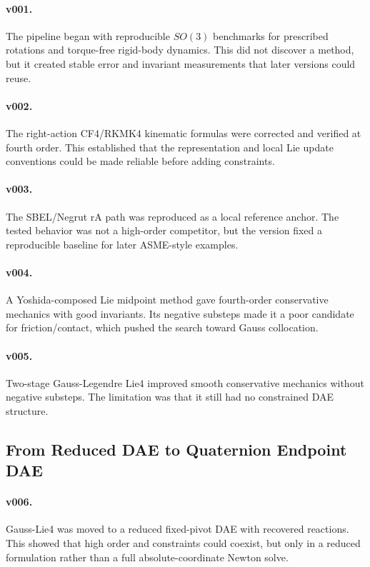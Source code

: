 \documentclass[10pt]{article}
\begin{document}
\paragraph{v001.}
The pipeline began with reproducible $SO(3)$ benchmarks for prescribed
rotations and torque-free rigid-body dynamics. This did not discover a method,
but it created stable error and invariant measurements that later versions
could reuse.

\paragraph{v002.}
The right-action CF4/RKMK4 kinematic formulas were corrected and verified at
fourth order. This established that the representation and local Lie update
conventions could be made reliable before adding constraints.

\paragraph{v003.}
The SBEL/Negrut rA path was reproduced as a local reference anchor. The tested
behavior was not a high-order competitor, but the version fixed a reproducible
baseline for later ASME-style examples.

\paragraph{v004.}
A Yoshida-composed Lie midpoint method gave fourth-order conservative
mechanics with good invariants. Its negative substeps made it a poor candidate
for friction/contact, which pushed the search toward Gauss collocation.

\paragraph{v005.}
Two-stage Gauss-Legendre Lie4 improved smooth conservative mechanics without
negative substeps. The limitation was that it still had no constrained DAE
structure.

\subsection{From Reduced DAE to Quaternion Endpoint DAE}

\paragraph{v006.}
Gauss-Lie4 was moved to a reduced fixed-pivot DAE with recovered reactions.
This showed that high order and constraints could coexist, but only in a
reduced formulation rather than a full absolute-coordinate Newton solve.
\end{document}
